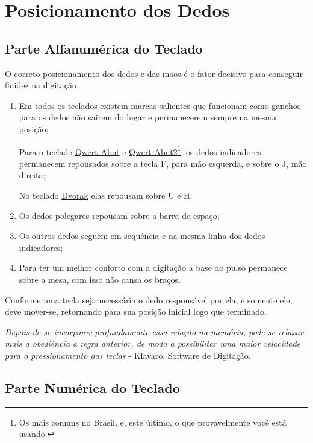 \documentclass[12pt,a4]{book}
\begin{document}
\section{Posicionamento dos Dedos}

\subsection{Parte Alfanumérica do Teclado}

O correto posicionamento dos dedos e das mãos é o fator decisivo para
conseguir fluidez na digitação.

\begin{enumerate}

\item Em todos os teclados existem marcas salientes que funcionam como ganchos
para os dedos não sairem do lugar e permanecerem sempre na mesma posição;

Para o teclado \underline{Qwert Abnt} e \underline{Qwert Abnt2}\footnote{Os
mais comuns no Brasil, e, este último, o que provavelmente você está usando.}:
os dedos indicadores permanecem repousados sobre a tecla \textsc{F}, para mão
esquerda, e sobre o \textsc{J}, mão direita;

No teclado \underline{Dvorak} elas repousam sobre \textsc{U} e \textsc{H};

\item Os dedos polegares repousam sobre a barra de espaço;

\item Os outros dedos seguem em sequência e na mesma linha dos dedos
indicadores;

\item Para ter um melhor conforto com a digitação a base do pulso
permanece sobre a mesa, com isso não cansa os braços.

\end{enumerate}

Conforme uma tecla seja necessária o dedo responsável por ela, e
somente ele, deve mover-se, retornando para sua posição inicial logo
que terminado.

\textit{Depois de se incorporar profundamente essa relação na memória, pode-se
relaxar mais a obediência à regra anterior, de modo a possibilitar uma maior
velocidade para o pressionamento das teclas} -
Klavaro, Software de Digitação.

\subsection{Parte Numérica do Teclado}
\end{document}
